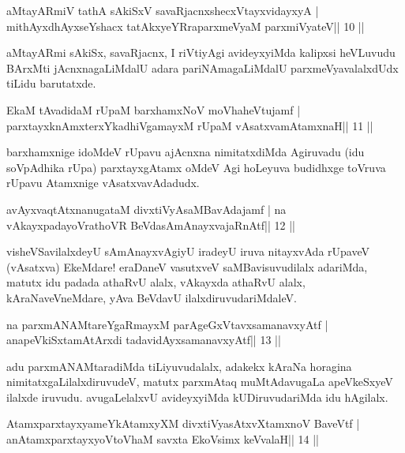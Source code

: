 \begin{shl}
aMtayARmiV tathA sAkiSxV savaRjacnxshecxVtayxvidayxyA |
mithAyxdhAyxseYshacx tatAkxyeYRraparxmeVyaM parxmiVyateV\hfill || 10 ||
\end{shl}

\begin{artha}
aMtayARmi sAkiSx, savaRjacnx, I riVtiyAgi avideyxyiMda kalipxsi
heVLuvudu BArxMti jAcnxnagaLiMdalU adara pariNAmagaLiMdalU
parxmeVyavalalxdUdx tiLidu barutatxde.
\end{artha}

\begin{shl}
EkaM tAvadidaM rUpaM barxhamxNoV moVhaheVtujamf |
parxtayxknAmxterxYkadhiVgamayxM rUpaM vAsatxvamAtamxnaH\hfill || 11 ||
\end{shl}

\begin{artha}
barxhamxnige idoMdeV rUpavu ajAcnxna nimitatxdiMda Agiruvadu (idu
soVpAdhika rUpa) parxtayxgAtamx oMdeV Agi hoLeyuva budidhxge toVruva
rUpavu Atamxnige vAsatxvavAdadudx.
\end{artha}

\begin{shl}
avAyxvaqtAtxnanugataM divxtiVyAsaMBavAdajamf |
na vAkayxpadayoVrathoVR BeVdasAmAnayxvajaRnAtf\hfill || 12 ||
\end{shl}

\begin{artha}
visheVSavilalxdeyU sAmAnayxvAgiyU iradeyU iruva nitayxvAda rUpaveV (vAsatxva) EkeMdare! eraDaneV vasutxveV saMBavisuvudilalx adariMda, matutx idu padada athaRvU alalx, vAkayxda athaRvU alalx, kAraNaveVneMdare, yAva BeVdavU ilalxdiruvudariMdaleV.
\end{artha}

\begin{shl}
na parxmANAMtareYgaRmayxM parAgeGxVtavxsamanavxyAtf |
anapeVkiSxtamAtArxdi tadavidAyxsamanavxyAtf\hfill || 13 ||
\end{shl}

\begin{artha}
adu parxmANAMtaradiMda tiLiyuvudalalx, adakekx kAraNa horagina nimitatxgaLilalxdiruvudeV, matutx parxmAtaq muMtAdavugaLa apeVkeSxyeV ilalxde iruvudu. avugaLelalxvU avideyxyiMda kUDiruvudariMda idu hAgilalx.
\end{artha}



\begin{shl}
AtamxparxtayxyameYkAtamxyXM divxtiVyasAtxvXtamxnoV BaveVtf |
anAtamxparxtayxyoV\s toV\s haM savxta EkoV\s simx keVvalaH\hfill || 14 ||
\end{shl}


